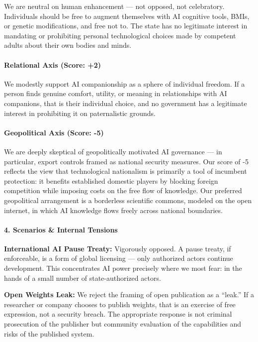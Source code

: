 We are neutral on human enhancement --- not opposed, not celebratory.
Individuals should be free to augment themselves with AI cognitive
tools, BMIs, or genetic modifications, and free not to. The state has no
legitimate interest in mandating or prohibiting personal technological
choices made by competent adults about their own bodies and minds.

\paragraph{Relational Axis (Score: +2)}\label{relational-axis-score-2-3}

We modestly support AI companionship as a sphere of individual freedom.
If a person finds genuine comfort, utility, or meaning in relationships
with AI companions, that is their individual choice, and no government
has a legitimate interest in prohibiting it on paternalistic grounds.

\paragraph{Geopolitical Axis (Score:
-5)}\label{geopolitical-axis-score--5}

We are deeply skeptical of geopolitically motivated AI governance --- in
particular, export controls framed as national security measures. Our
score of -5 reflects the view that technological nationalism is
primarily a tool of incumbent protection: it benefits established
domestic players by blocking foreign competition while imposing costs on
the free flow of knowledge. Our preferred geopolitical arrangement is a
borderless scientific commons, modeled on the open internet, in which AI
knowledge flows freely across national boundaries.

\paragraph{4. Scenarios \& Internal
Tensions}\label{scenarios-internal-tensions-12}

\textbf{International AI Pause Treaty:} Vigorously opposed. A pause
treaty, if enforceable, is a form of global licensing --- only
authorized actors continue development. This concentrates AI power
precisely where we most fear: in the hands of a small number of
state-authorized actors.

\textbf{Open Weights Leak:} We reject the framing of open publication as
a ``leak.'' If a researcher or company chooses to publish weights, that
is an exercise of free expression, not a security breach. The
appropriate response is not criminal prosecution of the publisher but
community evaluation of the capabilities and risks of the published
system.

